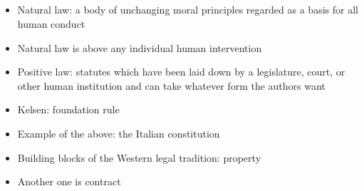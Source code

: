 \documentclass{article}
\begin{document}
\subsection{}
\begin{itemize}
\item Natural law: a body of unchanging moral principles regarded as a basis for all human conduct 
\item Natural law is above any individual human intervention 
\item Positive law: statutes which have been laid down by a legislature, court, or other human institution and can take whatever form the authors want
\item Kelsen: foundation rule
\item Example of the above: the Italian constitution 
\item Building blocks of the Western legal tradition: property 
\item Another one is contract
\end{itemize}
\end{document}
